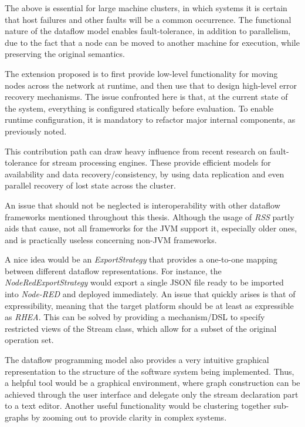\documentclass{dithesis}
\begin{document}
The above is essential for large machine clusters, in which systems it is certain that host failures and other faults will be a common occurrence. The functional nature of the dataflow model enables fault-tolerance, in addition to parallelism, due to the fact that a node can be moved to another machine for execution, while preserving the original semantics.

The extension proposed is to first provide low-level functionality for moving nodes across the network at runtime, and then use that to design high-level error recovery mechanisms. The issue confronted here is that, at the current state of the system, everything is configured statically before evaluation. To enable runtime configuration, it is mandatory to refactor major internal components, as previously noted.

This contribution path can draw heavy influence from recent research on fault-tolerance for stream processing engines\cite{borealis,dstreams,wide_area}. These provide efficient models for availability and data recovery/consistency, by using data replication and even parallel recovery of lost state across the cluster.


An issue that should not be neglected is interoperability with other dataflow frameworks mentioned throughout this thesis. Although the usage of \textit{RSS} partly aids that cause, not all frameworks for the JVM support it, especially older ones, and is practically useless concerning non-JVM frameworks.

A nice idea would be an \textit{ExportStrategy} that provides a one-to-one mapping between different dataflow representations. For instance, the \textit{NodeRedExportStrategy} would export a single JSON file ready to be imported into \textit{Node-RED} and deployed immediately. An issue that quickly arises is that of expressibility, meaning that the target platform should be at least as expressible as \textit{RHEA}. This can be solved by providing a mechanism/DSL to specify restricted views of the Stream class, which allow for a subset of the original operation set. 


The dataflow programming model also provides a very intuitive graphical representation to the structure of the software system being implemented. Thus, a helpful tool would be a graphical environment, where graph construction can be achieved through the user interface and delegate only the stream declaration part to a text editor. Another useful functionality would be clustering together sub-graphs by zooming out to provide clarity in complex systems.
\end{document}
